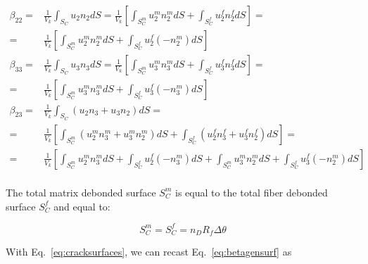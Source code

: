 \documentclass[review]{elsarticle}
\begin{document}
\begin{equation}\label{eq:betagensurf}
\begin{aligned}
\beta_{22}=&\frac{1}{V_{k}}\int_{S_{C}}u_{2}n_{2}dS=\frac{1}{V_{k}}\left[\int_{S_{C}^{m}}u_{2}^{m}n_{2}^{m}dS+\int_{S_{C}^{f}}u_{2}^{f}n_{2}^{f}dS\right]=\\
=&\frac{1}{V_{k}}\left[\int_{S_{C}^{m}}u_{2}^{m}n_{2}^{m}dS+\int_{S_{C}^{f}}u_{2}^{f}\left(-n_{2}^{m}\right)dS\right]\\
\beta_{33}=&\frac{1}{V_{k}}\int_{S_{C}}u_{3}n_{3}dS=\frac{1}{V_{k}}\left[\int_{S_{C}^{m}}u_{3}^{m}n_{3}^{m}dS+\int_{S_{C}^{f}}u_{3}^{f}n_{3}^{f}dS\right]=\\
=&\frac{1}{V_{k}}\left[\int_{S_{C}^{m}}u_{3}^{m}n_{3}^{m}dS+\int_{S_{C}^{f}}u_{3}^{f}\left(-n_{3}^{m}\right)dS\right]\\
\beta_{23}=&\frac{1}{V_{k}}\int_{S_{C}}\left(u_{2}n_{3}+u_{3}n_{2}\right)dS=\\
=&\frac{1}{V_{k}}\left[\int_{S_{C}^{m}}\left(u_{2}^{m}n_{3}^{m}+u_{3}^{m}n_{2}^{m}\right)dS+\int_{S_{C}^{f}}\left(u_{2}^{f}n_{3}^{f}+u_{3}^{f}n_{2}^{f}\right)dS\right]=\\
=&\frac{1}{V_{k}}\left[\int_{S_{C}^{m}}u_{2}^{m}n_{3}^{m}dS+\int_{S_{C}^{f}}u_{2}^{f}\left(-n_{3}^{m}\right)dS+\int_{S_{C}^{m}}u_{3}^{m}n_{2}^{m}dS+\int_{S_{C}^{f}}u_{3}^{f}\left(-n_{2}^{m}\right)dS\right]\\
\end{aligned}
\end{equation}

The total matrix debonded surface $S_{C}^{m}$ is equal to the total fiber debonded surface $S_{C}^{f}$ and equal to:

\begin{equation}\label{eq:cracksurfaces}
S_{C}^{m}=S_{C}^{f}=n_{D}R_{f}\Delta\theta
\end{equation}

With Eq.~\ref{eq:cracksurfaces}, we can recast Eq.~\ref{eq:betagensurf} as
\end{document}
